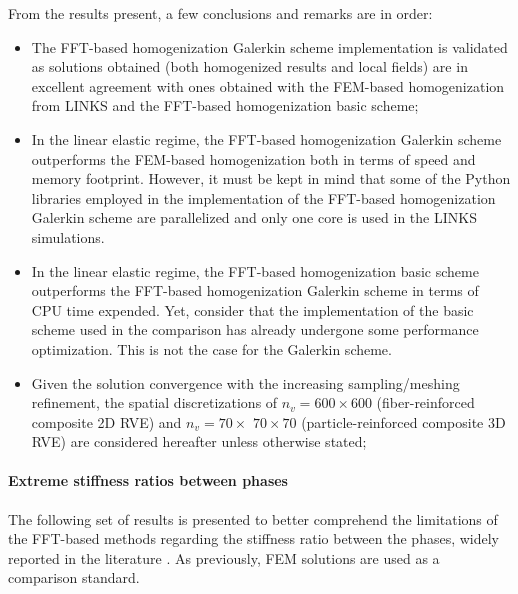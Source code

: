 From the results present, a few conclusions and remarks are in order:
\begin{itemize}
  \item The FFT-based homogenization Galerkin scheme implementation is validated as solutions obtained (both homogenized results and local fields) are in excellent agreement with ones obtained with the FEM-based homogenization from LINKS and the FFT-based homogenization basic scheme;
  \item In the linear elastic regime, the FFT-based homogenization Galerkin scheme outperforms the FEM-based homogenization both in terms of speed and memory footprint.
  However, it must be kept in mind that some of the Python libraries employed in the implementation of the FFT-based homogenization Galerkin scheme are parallelized and only one core is used in the LINKS simulations.
  \item In the linear elastic regime, the FFT-based homogenization basic scheme outperforms the FFT-based homogenization Galerkin scheme in terms of CPU time expended.
  Yet, consider that the implementation of the basic scheme used in the comparison \cite{} has already undergone some performance optimization.
  This is not the case for the Galerkin scheme.
  \item Given the solution convergence with the increasing sampling/meshing refinement, the spatial discretizations of \(n_{v}=600 \times 600\) (fiber-reinforced composite 2D RVE) and \(n_{v}=70 \times\) \(70 \times 70\) (particle-reinforced composite 3D RVE) are considered hereafter unless otherwise stated;
\end{itemize}

\FloatBarrier

\paragraph{Extreme stiffness ratios between phases}

The following set of results is presented to better comprehend the limitations of the FFT-based methods regarding the stiffness ratio between the phases, widely reported in the literature \citep{ma_numerical_2021}.
As previously, FEM solutions are used as a comparison standard.


